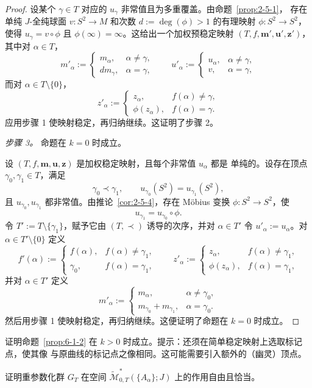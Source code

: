\begin{proof}
设某个 $\gamma\in T$ 对应的 $u_\gamma$ 非常值且为多重覆盖。由命题~\ref{prop:2-5-1}，
存在单纯 $J$-全纯球面 $v:S^2\to M$ 和次数
$d:=\deg(\phi)>1$ 的有理映射 $\phi:S^2\to S^2$，使得
$u_\gamma=v\circ\phi$ 且 $\phi(\infty)=\infty$。这给出一个加权预稳定映射
$(T,f,\mathbf m',\mathbf u',\mathbf z')$，其中对 $\alpha\in T$，
\[
  m'_\alpha:=
  \begin{cases}
    m_\alpha,&\alpha\ne\gamma,\\
    dm_\gamma,&\alpha=\gamma,
  \end{cases}
  \qquad
  u'_\alpha:=
  \begin{cases}
    u_\alpha,&\alpha\ne\gamma,\\
    v,&\alpha=\gamma,
  \end{cases}
\]
而对 $\alpha\in T\setminus\{0\}$，
\[
  z'_\alpha:=
  \begin{cases}
    z_\alpha,&f(\alpha)\ne\gamma,\\
    \phi(z_\alpha),&f(\alpha)=\gamma.
  \end{cases}
\]
应用步骤 1 使映射稳定，再归纳继续。这证明了步骤 2。

\emph{步骤 3。}
命题在 $k=0$ 时成立。

设 $(T,f,\mathbf m,\mathbf u,\mathbf z)$ 是加权稳定映射，且每个非常值 $u_\alpha$ 都是
单纯的。设存在顶点 $\gamma_0,\gamma_1\in T$，满足
\[
  \gamma_0\prec\gamma_1,
  \qquad
  u_{\gamma_0}(S^2)=u_{\gamma_1}(S^2),
\]
且 $u_{\gamma_0},u_{\gamma_1}$ 都非常值。由推论~\ref{cor:2-5-4}，存在 Möbius 变换
$\phi:S^2\to S^2$，使
\[
  u_{\gamma_1}=u_{\gamma_0}\circ\phi.
\]
令 $T':=T\setminus\{\gamma_1\}$，赋予它由 $(T,\prec)$ 诱导的次序，并对
$\alpha\in T'$ 令 $u'_\alpha:=u_\alpha$。对 $\alpha\in T'\setminus\{0\}$ 定义
\[
  f'(\alpha):=
  \begin{cases}
    f(\alpha),&f(\alpha)\ne\gamma_1,\\
    \gamma_0,&f(\alpha)=\gamma_1,
  \end{cases}
  \qquad
  z'_\alpha:=
  \begin{cases}
    z_\alpha,&f(\alpha)\ne\gamma_1,\\
    \phi(z_\alpha),&f(\alpha)=\gamma_1,
  \end{cases}
\]
并对 $\alpha\in T'$ 定义
\[
  m'_\alpha:=
  \begin{cases}
    m_\alpha,&\alpha\ne\gamma_0,\\
    m_{\gamma_0}+m_{\gamma_1},&\alpha=\gamma_0.
  \end{cases}
\]
然后用步骤 1 使映射稳定，再归纳继续。这便证明了命题在 $k=0$ 时成立。
\end{proof}

\begin{exercise}\label{ex:6-1-3}
证明命题~\ref{prop:6-1-2} 在 $k>0$ 时成立。提示：还须在简单稳定映射上选取标记点，使其像
与原曲线的标记点之像相同。这可能需要引入额外的（幽灵）顶点。
\end{exercise}

\begin{exercise}\label{ex:6-1-4}
证明重参数化群 $G_T$ 在空间
$\widetilde{\mathcal M}^*_{0,T}(\{A_\alpha\};J)$ 上的作用自由且恰当。
\end{exercise}
